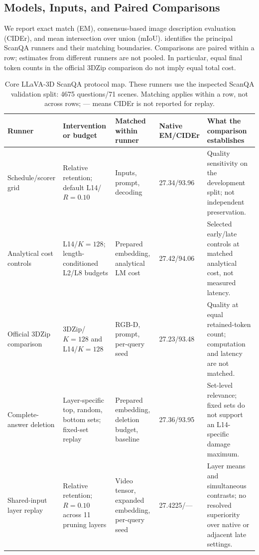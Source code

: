 \subsection{Models, Inputs, and Paired Comparisons}
We report exact match (EM), consensus-based image description evaluation (CIDEr), and mean intersection over union (mIoU).
 identifies the principal ScanQA runners and their matching boundaries. Comparisons are paired within a row; estimates from different runners are not pooled. In particular, equal final token counts in the official 3DZip comparison do not imply equal total cost.
\begin{table}[t]
\centering
\small
\setlength{\tabcolsep}{4pt}
\caption{Core LLaVA-3D ScanQA protocol map. These runners use the inspected ScanQA validation split: 4675 questions/71 scenes. Matching applies within a row, not across rows; --- means CIDEr is not reported for replay.}
\label{tab:supp_protocolmap}
\begin{tabular}{@{}p{}p{}p{}p{}p{}@{}}
\toprule
Runner & Intervention or budget & Matched within runner & Native EM/CIDEr & What the comparison establishes \\
\midrule
Schedule/scorer grid & Relative retention; default L14/$R=0.10$ & Inputs, prompt, decoding & 27.34/93.96 & Quality sensitivity on the development split; not independent preservation. \\
Analytical cost controls & L14/$K=128$; length-conditioned L2/L8 budgets & Prepared embedding, analytical LM cost & 27.42/94.06 & Selected early/late controls at matched analytical cost, not measured latency. \\
Official 3DZip comparison & 3DZip/$K=128$ and L14/$K=128$ & RGB-D, prompt, per-query seed & 27.23/93.48 & Quality at equal retained-token count; computation and latency are not matched. \\
Complete-answer deletion & Layer-specific top, random, bottom sets; fixed-set replay & Prepared embedding, deletion budget, baseline & 27.36/93.95 & Set-level relevance; fixed sets do not support an L14-specific damage maximum. \\
Shared-input layer replay & Relative retention; $R=0.10$ across 11 pruning layers & Video tensor, expanded embedding, per-query seed & 27.4225/--- & Layer means and simultaneous contrasts; no resolved superiority over native or adjacent late settings. \\
\bottomrule
\end{tabular}
\end{table}

